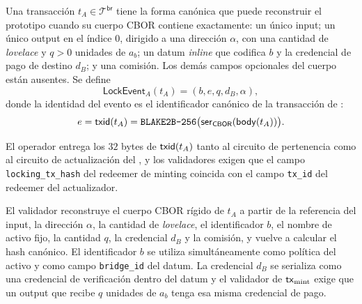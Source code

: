 \begin{definition}
\label{def:evento-locking}
\normalfont
Una transacción $t_A\in\mathcal{T}^{\mathsf{br}}$ tiene la forma canónica que puede reconstruir el prototipo cuando su cuerpo CBOR contiene exactamente: un único input; un único output en el índice $0$, dirigido a una dirección $\alpha$, con una cantidad de \textit{lovelace} y $q>0$ unidades de $a_b$; un datum \textit{inline} que codifica $b$ y la credencial de pago de destino $d_B$; y una comisión. Los demás campos opcionales del cuerpo están ausentes. Se define
$$\mathsf{LockEvent}_A(t_A)=(b,e,q,d_B,\alpha),$$
donde la identidad del evento es el identificador canónico de la transacción de \Cardano:
$$e=\mathsf{txid}(t_A)=\texttt{BLAKE2B-256}\bigl(\mathsf{ser}_{\mathsf{CBOR}}(\mathsf{body}(t_A))\bigr).$$
\end{definition}

El operador entrega los $32$ bytes de $\mathsf{txid}(t_A)$ tanto al circuito de pertenencia como al circuito de actualización del \SMT, y los validadores exigen que el campo \texttt{locking\_tx\_hash} del redeemer de minting coincida con el campo \texttt{tx\_id} del redeemer del actualizador.

El validador reconstruye el cuerpo CBOR rígido de $t_A$ a partir de la referencia del input, la dirección $\alpha$, la cantidad de \textit{lovelace}, el identificador $b$, el nombre de activo fijo, la cantidad $q$, la credencial $d_B$ y la comisión, y vuelve a calcular el hash canónico. El identificador $b$ se utiliza simultáneamente como política del activo y como campo \texttt{bridge\_id} del datum. La credencial $d_B$ se serializa como una credencial de verificación dentro del datum y el validador de $\mathsf{tx}_{\mathrm{mint}}$ exige que un output que recibe $q$ unidades de $a_b$ tenga esa misma credencial de pago.

